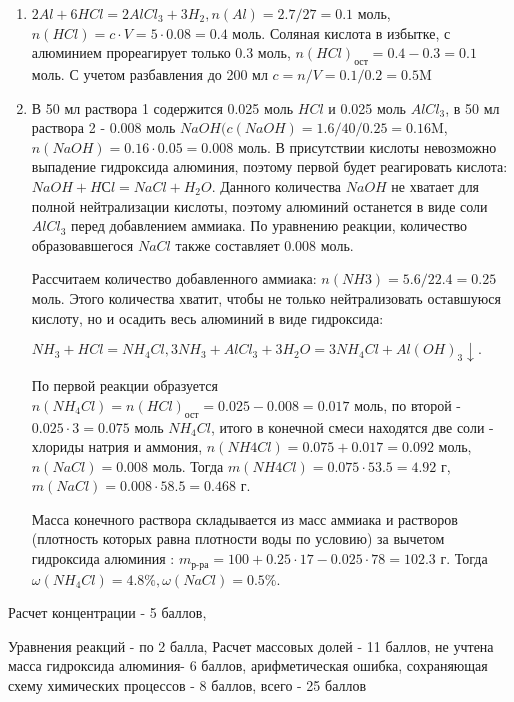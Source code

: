 \solutionSection

\begin{enumerate}
    \item $2Al + 6HCl = 2AlCl_3 + 3H_2, n(Al) = 2.7/27 = 0.1$ моль, $n(HCl) = c \cdot V = 5 \cdot 0.08 = 0.4$ моль. 
    Соляная кислота в избытке, с алюминием прореагирует только 0.3 моль, $n(HCl)_\text{ост} = 0.4 - 0.3 = 0.1$ моль. 
    С учетом разбавления до 200 мл $c = n/V = 0.1/0.2 = 0.5$M
    \item В 50 мл раствора 1 содержится 0.025 моль $HCl$ и 0.025 моль $AlCl_3$, в 50 мл раствора 2 - 0.008 моль 
    $NaOH (c(NaOH) = 1.6/40/0.25= 0.16$M, $n(NaOH) = 0.16 \cdot 0.05 = 0.008$ моль. В присутствии кислоты невозможно 
    выпадение гидроксида алюминия, поэтому первой будет реагировать кислота: $NaOH + HСl = NaCl + H_2O$. Данного 
    количества $NaOH$ не хватает для полной нейтрализации кислоты, поэтому алюминий останется в виде соли $AlCl_3$ 
    перед добавлением аммиака. По уравнению реакции, количество образовавшегося $NaCl$ также составляет 0.008 моль.
    
    Рассчитаем количество добавленного аммиака: $n(NH3) = 5.6/22.4 = 0.25$ моль. Этого количества хватит, чтобы не 
    только нейтрализовать оставшуюся кислоту, но и осадить весь алюминий в виде гидроксида:

    $NH_3 + HCl = NH_4Cl, 3NH_3 + AlCl_3 + 3H_2O = 3NH_4Cl + Al(OH)_3 \downarrow.$ 
    
    По первой реакции образуется $n(NH_4Cl) = n(HCl)_\text{ост} = 0.025 - 0.008 = 0.017$ моль, по второй - 
    $0.025 \cdot 3 = 0.075$ моль $NH_4Cl$, итого в конечной смеси находятся две соли - хлориды натрия и аммония, 
    $n(NH4Cl) = 0.075 + 0.017 = 0.092$ моль, $n(NaCl) = 0.008$ моль. Тогда $m(NH4Cl) = 0.075 \cdot 53.5 = 4.92$ г,  
    $m(NaCl) = 0.008 \cdot 58.5 = 0.468$ г. 

    Масса конечного раствора складывается из масс аммиака и растворов (плотность которых равна плотности воды по 
    условию) за вычетом гидроксида алюминия : $m_{\text{р-ра}} = 100 + 0.25 \cdot 17 - 0.025 \cdot 78= 102.3$ г. 
    Тогда $\omega(NH_4Cl) = 4.8\%, \omega(NaCl) = 0.5\%$. 
    
\end{enumerate}

Расчет концентрации - 5 баллов, 

Уравнения реакций - по 2 балла, Расчет массовых долей - 11 баллов, не учтена масса гидроксида алюминия- 6 баллов, арифметическая ошибка, сохраняющая схему химических процессов - 8 баллов, всего - 25 баллов
